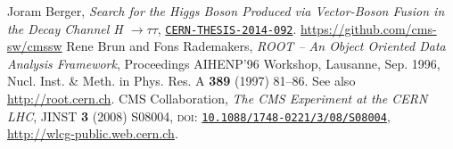  \begin{thebibliography}{99}
    Joram Berger,
      \textit{Search for the Higgs Boson Produced via Vector-Boson
                        Fusion in the Decay Channel H $\to \tau \tau$},
      \href{https://cds.cern.ch/record/1747055}{\texttt{CERN-THESIS-2014-092}}.
    \url{https://github.com/cms-sw/cmssw}
      Rene Brun and Fons Rademakers, 
      \emph{ROOT -- An Object Oriented Data Analysis Framework}, 
      Proceedings AIHENP'96 Workshop, Lausanne, Sep. 1996, Nucl. Inst. \& Meth. in Phys. Res. A \textbf{389} (1997) 81--86. See also \url{http://root.cern.ch}.
      CMS Collaboration,
      \emph{The CMS Experiment at the CERN LHC},
      JINST \textbf{3} (2008) S08004, 
      \textsc{doi}: \href{http://dx.doi.org/10.1088/1748-0221/3/08/S08004}{\texttt{10.1088/1748-0221/3/08/S08004}},
      \url{http://wlcg-public.web.cern.ch}.
\end{thebibliography}

